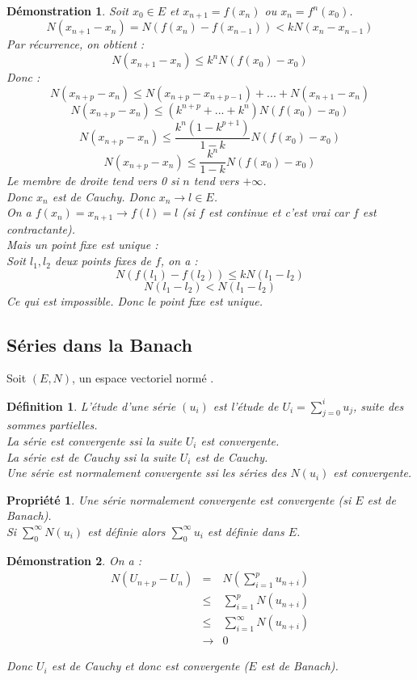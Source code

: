 \documentclass[a4paper, oneside]{report}
\theoremstyle{break}
\newtheorem{defi}[thm]{Définition}
\newtheorem{propr}[thm]{Propriété}
\newtheorem*{demo}{Démonstration}
\newcommand{\evn}{espace vectoriel normé }
\begin{document}
\begin{demo}
Soit $x_0\in E$ et $x_{n+1}=f(x_n)$ ou $x_n=f^n(x_0)$.\\
$$N(x_{n+1}-x_n)=N(f(x_n)-f(x_{n-1}))< kN(x_n-x_{n-1})$$
Par récurrence, on obtient :
$$N(x_{n+1}-x_n) \leq k^nN(f(x_0)-x_0)$$
Donc :
$$N(x_{n+p}-x_n)\leq N(x_{n+p}-x_{n+p-1})+...+N(x_{n+1}-x_n)$$
$$N(x_{n+p}-x_n)\leq (k^{n+p}+...+k^n)N(f(x_0)-x_0)$$
$$N(x_{n+p}-x_n)\leq \frac{k^n(1-k^{p+1})}{1-k} N(f(x_0)-x_0)$$
$$N(x_{n+p}-x_n)\leq \frac{k^n}{1-k}N(f(x_0)-x_0)$$
Le membre de droite tend vers 0 si $n$ tend vers $+\infty$.\\
Donc $x_n$ est de Cauchy. Donc $x_n\rightarrow l \in E$.\\
On a $f(x_n)=x_{n+1}\rightarrow f(l)=l$ (si $f$ est continue et c'est vrai car $f$ est contractante).\\
Mais un point fixe est unique :\\
Soit $l_1,l_2$ deux points fixes de $f$, on a :
$$N(f(l_1)-f(l_2)) \leq kN(l_1-l_2)$$
$$N(l_1-l_2) < N(l_1-l_2)$$
Ce qui est impossible. Donc le point fixe est unique.
\end{demo}



\subsection{Séries dans la Banach}

Soit $(E,N)$, un \evn.\\

\begin{defi}                    
L'étude d'une série $(u_i)$ est l'étude de $U_i=\sum_{j=0}^{i}u_j$, suite des sommes partielles.\\
La série est convergente ssi la suite $U_i$ est convergente.\\
La série est de Cauchy ssi la suite $U_i$ est de Cauchy.\\
Une série est normalement convergente ssi les séries des $N(u_i)$ est convergente.
\end{defi}

\begin{propr}
Une série normalement convergente est convergente (si $E$ est de Banach).\\
Si $\sum_{0}^\infty N(u_i)$ est définie alors $\sum_{0}^\infty u_i$ est définie dans $E$.
\end{propr}


\begin{demo}
On a :
$$\begin{array}{lll}
N(U_{n+p}-U_n)&=&N(\sum_{i=1}^p u_{n+i})\\
&\leq & \sum_{i=1}^p N(u_{n+i})\\
&\leq & \sum_{i=1}^\infty N(u_{n+i})\\
&\rightarrow & 0
\end{array}$$

Donc $U_i$ est de Cauchy et donc est convergente ($E$ est de Banach).

\end{demo}
\end{document}
